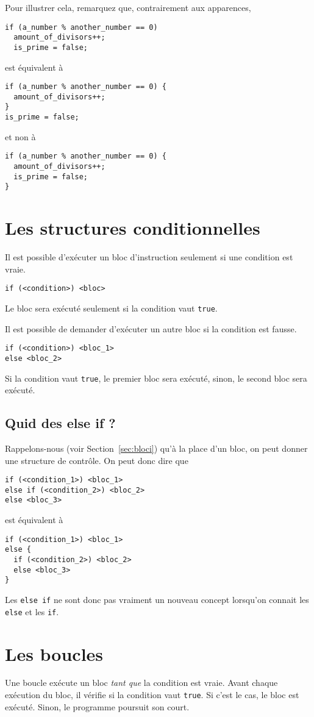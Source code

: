 Pour illustrer cela, remarquez que, contrairement aux apparences,
\begin{lstlisting}
if (a_number % another_number == 0)
  amount_of_divisors++;
  is_prime = false;
\end{lstlisting}
est équivalent à
\begin{lstlisting}
if (a_number % another_number == 0) {
  amount_of_divisors++;
}
is_prime = false;
\end{lstlisting}
et non à
\begin{lstlisting}
if (a_number % another_number == 0) {
  amount_of_divisors++;
  is_prime = false;
}
\end{lstlisting}

\section{Les structures conditionnelles}
Il est possible d'exécuter un bloc d'instruction seulement si une condition
est vraie.
\begin{lstlisting}
if (<condition>) <bloc>
\end{lstlisting}
Le bloc sera exécuté seulement si la condition vaut \lstinline|true|.

Il est possible de demander d'exécuter un autre bloc si la condition est fausse.
\begin{lstlisting}
if (<condition>) <bloc_1>
else <bloc_2>
\end{lstlisting}
Si la condition vaut \lstinline|true|, le premier bloc sera exécuté, sinon, le
second bloc sera exécuté.

\subsection{Quid des else if ?}
Rappelons-nous (voir Section~\ref{sec:bloci}) qu'à la place d'un bloc,
on peut donner une structure de contrôle.
On peut donc dire que
\begin{lstlisting}
if (<condition_1>) <bloc_1>
else if (<condition_2>) <bloc_2>
else <bloc_3>
\end{lstlisting}
est équivalent à
\begin{lstlisting}
if (<condition_1>) <bloc_1>
else {
  if (<condition_2>) <bloc_2>
  else <bloc_3>
}
\end{lstlisting}

Les \lstinline|else if| ne sont donc pas vraiment un nouveau concept lorsqu'on
connait les \lstinline|else| et les \lstinline|if|.

\section{Les boucles}
Une boucle exécute un bloc \emph{tant que} la condition est vraie.
Avant chaque exécution du bloc,
il vérifie si la condition vaut \lstinline|true|.
Si c'est le cas, le bloc est exécuté.
Sinon, le programme poursuit son court.

